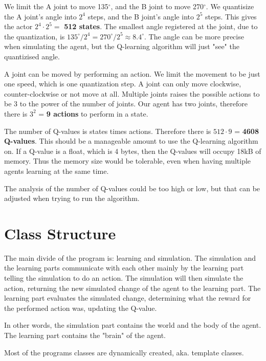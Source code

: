 \documentclass{article}
\begin{document}
We limit the A joint to move 135$^\circ$, and the B joint to move
270$^\circ$. We quantisize the A joint's angle into $2^4$ steps, and
the B joint's angle into $2^5$ steps. This gives the actor
$2^4 \cdot 2^5 =$ \textbf{512 states}. The smallest angle registered at
the joint, due to the quantization, is
$135^\circ / 2^4 = 270^\circ / 2^5 \approx 8.4^\circ$.
The angle can be more precise when simulating the agent, but the
Q-learning algorithm will just "see" the quantizised angle.

A joint can be moved by performing an action. We limit the movement to be
just one speed, which is one quantization step. A joint can only move
clockwise, counter-clockwise or not move at all. Multiple joints raises the
possible actions to be 3 to the power of the number of joints. Our
agent has two joints, therefore there is $3^2$ = \textbf{9 actions} to
perform in a state.

The number of Q-values is states times actions. Therefore there is
$512 \cdot 9$ = \textbf{4608 Q-values}. This should be a manageable
amount to use the Q-learning algorithm on. If a Q-value is a float,
which is 4 bytes, then the Q-values will occupy 18kB of memory.
Thus the memory size would be tolerable, even when having multiple agents
learning at the same time.

The analysis of the number of Q-values could be too high or low, but that
can be adjusted when trying to run the algorithm.



\section{Class Structure}
The main divide of the program is: learning and simulation. The
simulation and the learning parts communicate with each other mainly by the
learning part telling the simulation to do an action. The simulation will then
simulate the action, returning the new simulated change of the agent to the
learning part. The learning part evaluates the simulated change, determining
what the reward for the performed action was, updating the Q-value.

In other words, the simulation part contains the world and the body of the
agent. The learning part contains the "brain" of the agent.

Most of the programs classes are dynamically created, aka. template classes.
\end{document}
